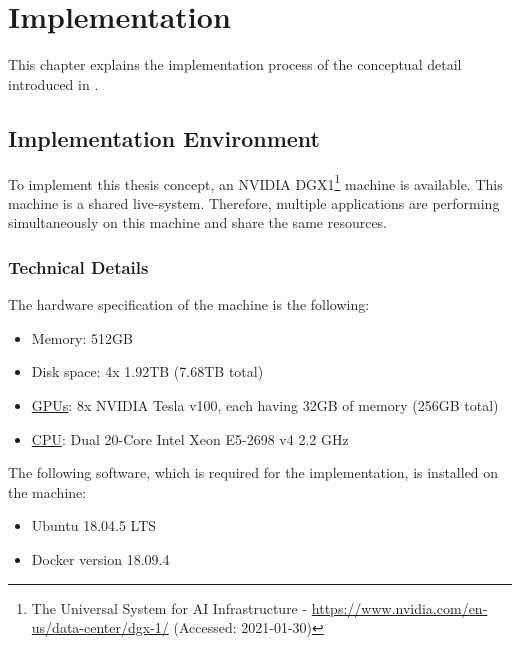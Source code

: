 \chapter{Implementation}
\label{chap:06_implementation}

This chapter explains the implementation process of the conceptual detail introduced in .


\section{Implementation Environment}
\label{sec:06_impl-env}
To implement this thesis concept, an NVIDIA DGX1\footnote{The Universal System for AI Infrastructure - \url{https://www.nvidia.com/en-us/data-center/dgx-1/} (Accessed: 2021-01-30)} machine is available. 
This machine is a shared live-system. Therefore, multiple applications are performing simultaneously on this machine and share the same resources.


\subsection{Technical Details}
The hardware specification of the machine is the following:
\begin{itemize}
\item Memory: 512GB
\item Disk space: 4x 1.92TB (7.68TB total)
\item \hyperlink{abbr:gpu}{GPUs}: 8x NVIDIA Tesla v100, each having 32GB of memory (256GB total)
\item \hyperlink{abbr:cpu}{CPU}: Dual 20-Core Intel Xeon E5-2698 v4 2.2 GHz
\end{itemize}


The following software, which is required for the implementation, is installed on the machine:
\begin{itemize}
\item Ubuntu 18.04.5 LTS
\item Docker version 18.09.4
\end{itemize}


